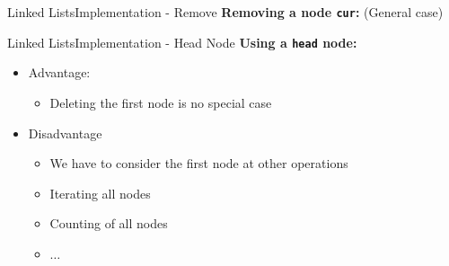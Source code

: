 
\begin{frame}[fragile]{Linked Lists}{Implementation - Remove}
  \textbf{Removing a node \texttt{cur}:} (General case)
  
\end{frame}


\begin{frame}{Linked Lists}{Implementation - Head Node}
  \textbf{Using a \texttt{head} node:}
  \begin{itemize}
  \item<2->Advantage:
    \begin{itemize}
    \item<3->
      Deleting the first node is no special case
    \end{itemize}
  \item<4->Disadvantage
    \begin{itemize}
    \item<4->
      We have to consider the first node at other operations
    \item<5->
      Iterating all nodes
    \item<5->
      Counting of all nodes
    \item<6->
      $\dots$
    \end{itemize}
  \end{itemize}
  \begin{flushleft}
    
  \end{flushleft}
\end{frame}



